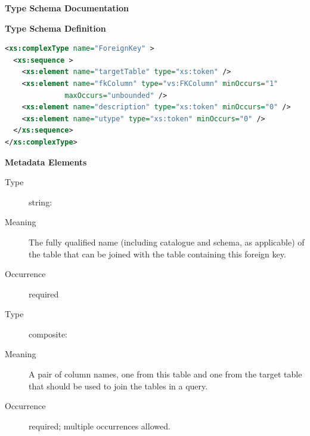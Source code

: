 \documentclass[11pt,a4paper]{ivoa}
\begin{document}
\begin{generated}
\begingroup
        \renewcommand*\descriptionlabel[1]{%
        \hbox to 5.5em{\emph{#1}\hfil}}\vspace{2ex}\noindent\textbf{ Type Schema Documentation}



\vspace{1ex}\noindent\textbf{ Type Schema Definition}

\begin{lstlisting}[language=XML,basicstyle=\footnotesize]
<xs:complexType name="ForeignKey" >
  <xs:sequence >
    <xs:element name="targetTable" type="xs:token" />
    <xs:element name="fkColumn" type="vs:FKColumn" minOccurs="1"
              maxOccurs="unbounded" />
    <xs:element name="description" type="xs:token" minOccurs="0" />
    <xs:element name="utype" type="xs:token" minOccurs="0" />
  </xs:sequence>
</xs:complexType>
\end{lstlisting}

\vspace{0.5ex}\noindent\textbf{ Metadata Elements}

\begingroup\small\begin{bigdescription}\item[Element \xmlel{targetTable}]
\begin{description}
\item[Type] string: 
\item[Meaning] The fully qualified name (including catalogue and schema, as
               applicable) of the table that can be joined with the
               table containing this foreign key.
\item[Occurrence] required

\end{description}
\item[Element \xmlel{fkColumn}]
\begin{description}
\item[Type] composite: 
\item[Meaning] A pair of column names, one from this table and one
               from the target table that should be used to join the
               tables in a query.
\item[Occurrence] required; multiple occurrences allowed.


\end{description}
\end{bigdescription}
\end{generated}
\end{document}
